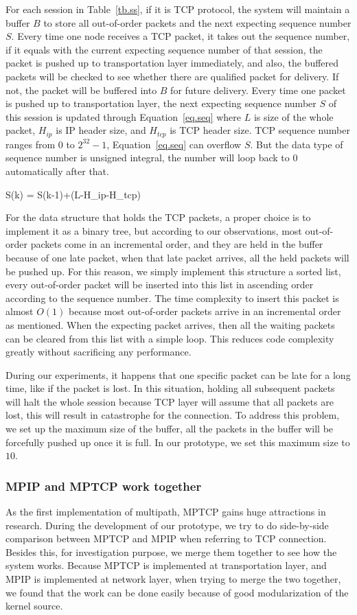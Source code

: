 For each session in Table~\ref{tb.ss}, if it is TCP protocol, the system will maintain a buffer $B$ to store all out-of-order packets and the next expecting sequence number $S$. Every time one node receives a TCP packet, it takes out the sequence number, if it equals with the current expecting sequence number of that session, the packet is pushed up to transportation layer immediately, and also, the buffered packets will be checked to see whether there are qualified packet for delivery. If not, the packet will be buffered into $B$ for future delivery. Every time one packet is pushed up to transportation layer, the next expecting sequence number $S$ of this session is updated through Equation~\ref{eq.seq} where $L$ is size of the whole packet, $H_{ip}$ is IP header size, and $H_{tcp}$ is TCP header size. TCP sequence number ranges from $0$ to $2^{32}-1$, Equation~\ref{eq.seq} can overflow $S$. But the data type of sequence number is unsigned integral, the number will loop back to $0$ automatically after that. 

\be
\label{eq.seq}
S(k) = S(k-1)+(L-H_{ip}-H_{tcp})
\ee

For the data structure that holds the TCP packets, a proper choice is to implement it as a binary tree, but according to our observations, most out-of-order packets come in an incremental order, and they are held in the buffer because of one late packet, when that late packet arrives, all the held packets will be pushed up. For this reason, we simply implement this structure a sorted list, every out-of-order packet will be inserted into this list in ascending order according to the sequence number. The time complexity to insert this packet is almost $O(1)$ because most out-of-order packets arrive in an incremental order as mentioned.
When the expecting packet arrives, then all the waiting packets can be cleared from this list with a simple loop. This reduces code complexity greatly without sacrificing any performance.

During our experiments, it happens that one specific packet can be late for a long time, like if the packet is lost. In this situation, holding all subsequent packets will halt the whole session because TCP layer will assume that all packets are lost, this will result in catastrophe for the connection. To address this problem, we set up the maximum size of the buffer, all the packets in the buffer will be forcefully pushed up once it is full. In our prototype, we set this maximum size to $10$.

\subsubsection{MPIP and MPTCP work together}
As the first implementation of multipath, MPTCP gains huge attractions in research. During the development of our prototype, we try to do side-by-side comparison between MPTCP and MPIP when referring to TCP connection. Besides this, for investigation purpose, we merge them together to see how the system works. Because MPTCP is implemented at transportation layer, and MPIP is implemented at network layer, when trying to merge the two together, we found that the work can be done easily because of good modularization of the kernel source. 

